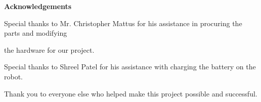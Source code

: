 
\begin{center}\textbf{Acknowledgements}\end{center}

    \par Special thanks to Mr. Christopher Mattus for his assistance in procuring the parts and modifying 		\par the hardware for our project.
    \par Special thanks to Shreel Patel for his assistance with charging the battery on the robot.
    \par Thank you to everyone else who helped make this project possible and successful.


\cleardoublepage



